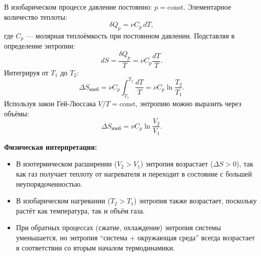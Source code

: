 \begin{theorem}
В изобарическом процессе давление постоянно: $p = \text{const}$. Элементарное количество теплоты:
\begin{equation}
    \delta Q_p = \nu C_p \, dT,
\end{equation}
где $C_p$ --- молярная теплоёмкость при постоянном давлении.
Подставляя в определение энтропии:
\begin{equation}
    dS = \frac{\delta Q_p}{T} = \nu C_p \frac{dT}{T}.
\end{equation}
Интегрируя от $T_1$ до $T_2$:
\begin{equation}
    \Delta S_{\text{изоб}} = \nu C_p \int_{T_1}^{T_2} \frac{dT}{T} = \nu C_p \ln\frac{T_2}{T_1}. \label{eq:delta_S_isob_67}
\end{equation}
Используя закон Гей-Люссака $V/T = \text{const}$, энтропию можно выразить через объёмы:
\begin{equation}
    \Delta S_{\text{изоб}} = \nu C_p \ln\frac{V_2}{V_1}.
\end{equation}
\end{theorem}

\begin{remark}
\textbf{Физическая интерпретация:}
\begin{itemize}
    \item В изотермическом расширении ($V_2 > V_1$) энтропия возрастает ($\Delta S > 0$), так как газ получает теплоту от нагревателя и переходит в состояние с большей неупорядоченностью.
    \item В изобарическом нагревании ($T_2 > T_1$) энтропия также возрастает, поскольку растёт как температура, так и объём газа.
    \item При обратных процессах (сжатие, охлаждение) энтропия системы уменьшается, но энтропия ``система + окружающая среда'' всегда возрастает в соответствии со вторым началом термодинамики.
\end{itemize}
\end{remark}
